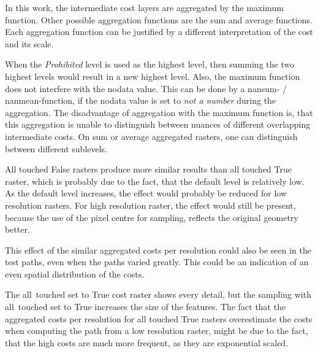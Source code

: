 In this work, the intermediate cost layers are aggregated by the maximum function. 
Other possible aggregation functions are the sum and average functions.
Each aggregation function can be justified by a different interpretation of the cost and its scale.

When the \textit{Prohibited} level is used as the highest level, then summing the two highest levels would result in a new highest level. 
Also, the maximum function does not interfere with the nodata value. 
This can be done by a nansum- / nanmean-function, if the nodata value is set to \textit{not a number} during the aggregation.
The disadvantage of aggregation with the maximum function is, that this aggregation is unable to distinguish between nuances of different overlapping intermediate costs.
On sum or average aggregated rasters, one can distinguish between different sublevels.

All touched False rasters produce more similar results than all touched True raster, which is probably due to the fact, that the default level is relatively low.
As the default level increases, the effect would probably be reduced for low resolution rasters.
For high resolution raster, the effect would still be present, because the use of the pixel centre for sampling, reflects the original geometry better.

This effect of the similar aggregated costs per resolution could also be seen in the test paths, even when the paths varied greatly.
This could be an indication of an even spatial distribution of the costs.

The all~touched set to True cost raster shows every detail, but the sampling with all~touched set to True increases the size of the features.
The fact that the aggregated costs per resolution for all touched True rasters overestimate the costs when computing the path from a low resolution raster, might be due to the fact, that the high costs are much more frequent, as they are exponential scaled.


